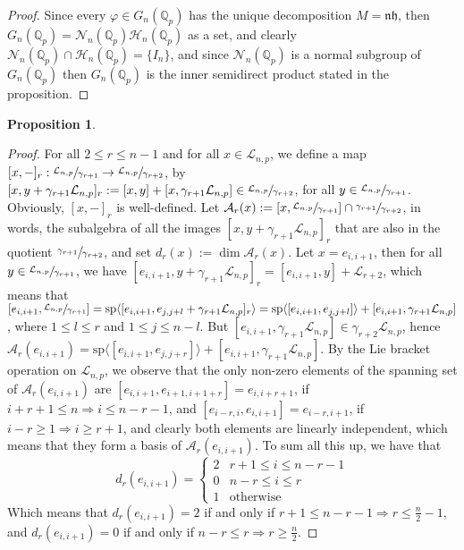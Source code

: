 \documentclass[12pt]{article}
\newtheorem{proposition}[theorem]{Proposition}
\begin{document}
\begin{proof}
Since every $\varphi\in{G_{n}(\mathbb{Q}_p)}$ has the unique decomposition $M=\mathfrak{n}\mathfrak{h}$, then $G_{n}(\mathbb{Q}_p)=\mathcal{N}_{n}(\mathbb{Q}_p)\mathcal{H}_{n}(\mathbb{Q}_p)$ as a set, and clearly $\mathcal{N}_{n}(\mathbb{Q}_p)\cap\mathcal{H}_{n}(\mathbb{Q}_p)=\{I_{n}\}$, and since $\mathcal{N}_{n}(\mathbb{Q}_p)$ is a normal subgroup of $G_{n}(\mathbb{Q}_p)$ then $G_{n}(\mathbb{Q}_p)$ is the inner semidirect product stated in the proposition.  
\end{proof}
\begin{proposition}

\end{proposition}
\begin{proof}
For all $2\leq{r}\leq{n-1}$ and for all $x\in\mathcal{L}_{n,p}$, we define a map $[x,-]_{r}:\sfrac{\mathcal{L}_{n,p}}{\gamma_{r+1}}\rightarrow\sfrac{\mathcal{L}_{n,p}}{\gamma_{r+2}}$, by $[x,y+\gamma_{r+1}\mathcal{L}_{n,p}]_{r}:=[x,y]+[x,\gamma_{r+1}\mathcal{L}_{n,p}]\in\sfrac{\mathcal{L}_{n,p}}{\gamma_{r+2}}$, for all $y\in\sfrac{\mathcal{L}_{n,p}}{\gamma_{r+1}}$. Obviously, $[x,-]_{r}$ is well-defined. Let $\mathcal{A}_{r}(x):=[x,\sfrac{\mathcal{L}_{n,p}}{\gamma_{r+1}}]\cap\sfrac{\gamma_{r+1}}{\gamma_{r+2}}$, in words, the subalgebra of all the images $[x,y+\gamma_{r+1}\mathcal{L}_{n,p}]_{r}$ that are also in the quotient $\sfrac{\gamma_{r+1}}{\gamma_{r+2}}$, and set $d_r(x):=\dim\mathcal{A}_{r}(x)$. 
Let $x=e_{i,i+1}$, then for all $y\in\sfrac{\mathcal{L}_{n,p}}{\gamma_{r+1}}$, we have $[e_{i,i+1},y+\gamma_{r+1}\mathcal{L}_{n,p}]_{r}=[e_{i,i+1},y]+\mathcal{L}_{r+2}$, which means that $[e_{i,i+1},\sfrac{\mathcal{L}_{n,p}}{\gamma_{r+1}}]=\mathrm{sp}\langle[e_{i,i+1},e_{j,j+l}+\gamma_{r+1}\mathcal{L}_{n,p}]_{r}\rangle=\mathrm{sp}\langle[e_{i,i+1},e_{j,j+l}]\rangle+[e_{i,i+1},\gamma_{r+1}\mathcal{L}_{n,p}]$, where $1\leq{l}\leq{r}$ and $1\leq{j}\leq{n-l}$. But $[e_{i,i+1},\gamma_{r+1}\mathcal{L}_{n,p}]\in\gamma_{r+2}\mathcal{L}_{n,p}$, hence $\mathcal{A}_{r}(e_{i,i+1})=\mathrm{sp}\langle[e_{i,i+1},e_{j,j+r}]\rangle+[e_{i,i+1},\gamma_{r+1}\mathcal{L}_{n,p}]$. By the Lie bracket operation on $\mathcal{L}_{n,p}$, we observe that the only non-zero elements of the spanning set of $\mathcal{A}_{r}(e_{i,i+1})$ are $[e_{i,i+1},e_{i+1,i+1+r}]=e_{i,i+r+1}$, if $i+r+1\leq{n}\Rightarrow{i\leq{n-r-1}}$, and $[e_{i-r,i},e_{i,i+1}]=e_{i-r,i+1}$, if $i-r\geq{1}\Rightarrow{i\geq{r+1}}$, and clearly both elements are linearly independent, which means that they form a basis of $\mathcal{A}_{r}(e_{i,i+1})$. To sum all this up, we have that
\[
    d_{r}(e_{i,i+1})=
    \begin{cases}
        2 & {r+1}\leq{i}\leq{n-r-1} \\
        0 & {n-r}\leq{i}\leq{r} \\
        1 & \mathrm{otherwise}
    \end{cases}
\]
Which means that $d_{r}(e_{i,i+1})=2$ if and only if $r+1\leq{n-r-1}\Rightarrow{r\leq{\frac{n}{2}-1}}$, and $d_{r}(e_{i,i+1})=0$ if and only if $n-r\leq{r}\Rightarrow{r\geq{\frac{n}{2}}}$.
\end{proof}
\end{document}
